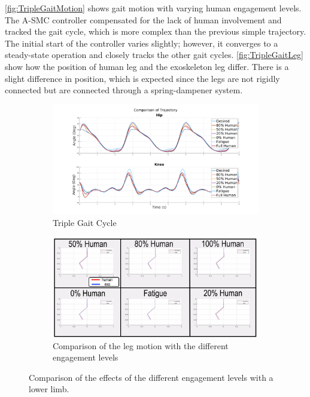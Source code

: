 \autoref{fig:TripleGaitMotion} shows gait motion with varying human engagement levels. The A-SMC controller compensated for the lack of human involvement and tracked the gait cycle, which is more complex than the previous simple trajectory. The initial start of the controller varies slightly; however, it converges to a steady-state operation and closely tracks the other gait cycles. \autoref{fig:TripleGaitLeg} show how the position of human leg and the exoskeleton leg differ. There is a slight difference in position, which is expected since the legs are not rigidly connected but are connected through a spring-dampener system.  




\begin{figure}
    \centering
    \begin{subfigure}{\linewidth}
        \centering
        \includegraphics[width=\columnwidth]{images/controllers/gait/traj.png}
        \caption[Triple Gait Cycle]{Triple Gait Cycle}
        \label{fig:TripleGaitJoint}
    \end{subfigure}
        \begin{subfigure}{\linewidth}
        \centering
        \includegraphics[width=\columnwidth]{images/controllers/gait/leg_frame_annotated.png}
        \caption[Engagement Levels of Leg Motion]{Comparison of the leg motion with the different engagement levels}
        \label{fig:TripleGaitLeg}
    \end{subfigure}
    \caption[Effects of the Different Engagement Levels]{Comparison of the effects of the different engagement levels with a lower limb.}
    \label{fig:TripleGaitMotion}
\end{figure}








